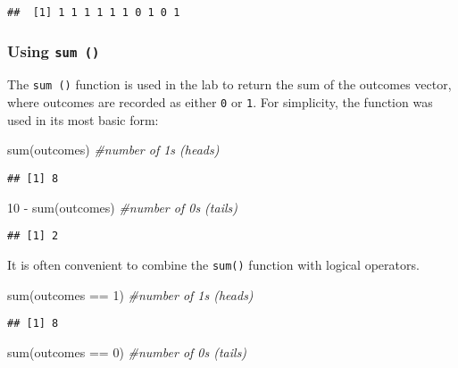 \documentclass[
]{article}
\newenvironment{Shaded}{\begin{snugshade}}{\end{snugshade}}
\newcommand{\CommentTok}[1]{\textcolor[rgb]{0.56,0.35,0.01}{\textit{#1}}}
\newcommand{\DecValTok}[1]{\textcolor[rgb]{0.00,0.00,0.81}{#1}}
\newcommand{\FunctionTok}[1]{\textcolor[rgb]{0.00,0.00,0.00}{#1}}
\newcommand{\NormalTok}[1]{#1}
\newcommand{\SpecialCharTok}[1]{\textcolor[rgb]{0.00,0.00,0.00}{#1}}
\begin{document}
\begin{verbatim}
##  [1] 1 1 1 1 1 1 0 1 0 1
\end{verbatim}

\hypertarget{using-sum}{%
\subsubsection{\texorpdfstring{Using
\texttt{sum\ ()}}{Using sum ()}}\label{using-sum}}

The \texttt{sum\ ()} function is used in the lab to return the sum of
the outcomes vector, where outcomes are recorded as either \texttt{0} or
\texttt{1}. For simplicity, the function was used in its most basic
form:

\begin{Shaded}
\begin{Highlighting}[]
\FunctionTok{sum}\NormalTok{(outcomes)       }\CommentTok{\#number of 1\textquotesingle{}s (heads)}
\end{Highlighting}
\end{Shaded}

\begin{verbatim}
## [1] 8
\end{verbatim}

\begin{Shaded}
\begin{Highlighting}[]
\DecValTok{10} \SpecialCharTok{{-}} \FunctionTok{sum}\NormalTok{(outcomes)  }\CommentTok{\#number of 0\textquotesingle{}s (tails)}
\end{Highlighting}
\end{Shaded}

\begin{verbatim}
## [1] 2
\end{verbatim}

It is often convenient to combine the \texttt{sum()} function with
logical operators.

\begin{Shaded}
\begin{Highlighting}[]
\FunctionTok{sum}\NormalTok{(outcomes }\SpecialCharTok{==} \DecValTok{1}\NormalTok{)  }\CommentTok{\#number of 1\textquotesingle{}s (heads)}
\end{Highlighting}
\end{Shaded}

\begin{verbatim}
## [1] 8
\end{verbatim}

\begin{Shaded}
\begin{Highlighting}[]
\FunctionTok{sum}\NormalTok{(outcomes }\SpecialCharTok{==} \DecValTok{0}\NormalTok{)  }\CommentTok{\#number of 0\textquotesingle{}s (tails)}
\end{Highlighting}
\end{Shaded}
\end{document}
